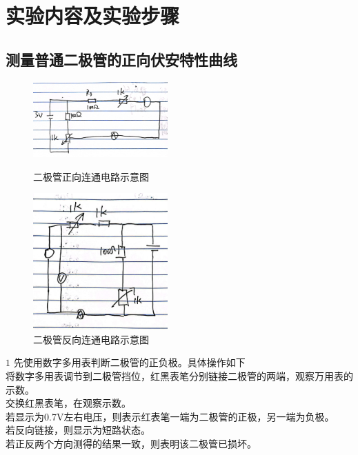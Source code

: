 \documentclass{ctexart}
\begin{document}
\section{实验内容及实验步骤}
  \subsection{测量普通二极管的正向伏安特性曲线}

  \begin{figure}[b]
    \centering
    \begin{minipage}[b]{0.48\textwidth}
      \centering
      \includegraphics[width=0.46\textwidth]{zhengxiangdianlu.jpg}
      \caption{二极管正向连通电路示意图}\label{zhengxiangdianlu}
    \end{minipage}
    \begin{minipage}[b]{0.48\textwidth}
      \centering
      \includegraphics[width=0.46\textwidth]{fanxiangdianlu.jpg}
      \caption{二极管反向连通电路示意图}\label{fanxiangdianlu}
    \end{minipage}
  \end{figure}

  \(1\) 先使用数字多用表判断二极管的正负极。具体操作如下\\
  将数字多用表调节到二极管挡位，红黑表笔分别链接二极管的两端，观察万用表的示数。\\
  交换红黑表笔，在观察示数。\\
  若显示为0.7V左右电压，则表示红表笔一端为二极管的正极，另一端为负极。\\
  若反向链接，则显示为短路状态。\\
  若正反两个方向测得的结果一致，则表明该二极管已损坏。
\end{document}
